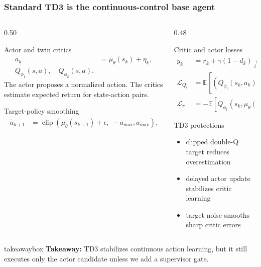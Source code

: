 \documentclass[aspectratio=169]{beamer}
\newcommand{\clip}{\operatorname{clip}}
\newcommand{\takeawaybox}[1]{%
\vspace{0.02cm}
\begin{center}
\begin{beamercolorbox}[wd=0.94\textwidth,sep=3pt,center,rounded=true,shadow=false]{takeawaybox}
\scriptsize
\textbf{\textcolor{maroon1}{Takeaway:}} #1
\end{beamercolorbox}
\end{center}
}
\begin{document}
\begin{frame}
\frametitle{\large \textbf{Standard TD3 is the continuous-control base agent}}
\scriptsize

\begin{columns}[T,onlytextwidth]
\begin{column}{0.50\textwidth}
\begin{block}{Actor and twin critics}
\begin{align*}
a_k &= \mu_\theta(s_k)+\eta_k,\\
Q_{\phi_1}(s,a),\quad Q_{\phi_2}(s,a).
\end{align*}
The actor proposes a normalized action. The critics estimate expected return for state-action pairs.
\end{block}

\begin{block}{Target-policy smoothing}
\begin{align*}
\tilde{a}_{k+1}
&=\clip\left(\mu_{\bar{\theta}}(s_{k+1})+\epsilon,\ -a_{\max},a_{\max}\right).
\end{align*}
\end{block}
\end{column}

\begin{column}{0.48\textwidth}
\begin{block}{Critic and actor losses}
\begin{align*}
y_k &= r_k+\gamma(1-d_k)
\min_{i=1,2}Q_{\bar{\phi}_i}(s_{k+1},\tilde{a}_{k+1}),\\
\mathcal{L}_{Q_i}
&=\mathbb{E}\left[(Q_{\phi_i}(s_k,a_k)-y_k)^2\right],\\
\mathcal{L}_{\pi}
&=-\mathbb{E}\left[Q_{\phi_1}(s_k,\mu_\theta(s_k))\right].
\end{align*}
\end{block}

\begin{block}{TD3 protections}
\begin{itemize}\justifying
  \setlength\itemsep{0.35ex}
  \item clipped double-Q target reduces overestimation
  \item delayed actor update stabilizes critic learning
  \item target noise smooths sharp critic errors
\end{itemize}
\end{block}
\end{column}
\end{columns}

\takeawaybox{TD3 stabilizes continuous action learning, but it still executes only the actor candidate unless we add a supervisor gate.}
\end{frame}
\end{document}
